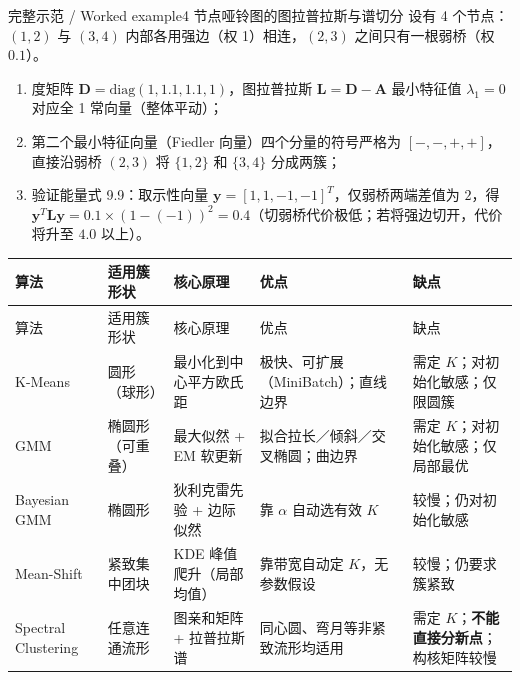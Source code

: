 \begin{StudyBlock}{完整示范 / Worked example}{4 节点哑铃图的图拉普拉斯与谱切分}
设有 4 个节点：$(1,2)$ 与 $(3,4)$ 内部各用强边（权 1）相连，$(2,3)$ 之间只有一根弱桥（权 $0.1$）。
\begin{enumerate}
\item 度矩阵 $\mathbf{D}=\mathrm{diag}(1, 1.1, 1.1, 1)$，图拉普拉斯 $\mathbf{L}=\mathbf{D}-\mathbf{A}$ 最小特征值 $\lambda_1=0$ 对应全 1 常向量（整体平动）；
\item 第二个最小特征向量（Fiedler 向量）四个分量的符号严格为 $[-, -, +, +]$，直接沿弱桥 $(2,3)$ 将 $\{1,2\}$ 和 $\{3,4\}$ 分成两簇；
\item 验证能量式 9.9：取示性向量 $\mathbf{y}=[1,1,-1,-1]^T$，仅弱桥两端差值为 $2$，得 $\mathbf{y}^T\mathbf{L}\mathbf{y} = 0.1\times (1-(-1))^2 = 0.4$（切弱桥代价极低；若将强边切开，代价将升至 $4.0$ 以上）。
\end{enumerate}
\end{StudyBlock}


\begingroup\small\setlength{\tabcolsep}{3pt}\renewcommand{\arraystretch}{1.22}
\begin{longtable}{@{}>{\raggedright\arraybackslash}p{}>{\raggedright\arraybackslash}p{}>{\raggedright\arraybackslash}p{}>{\raggedright\arraybackslash}p{}>{\raggedright\arraybackslash}p{}@{}}
\toprule
算法 & 适用簇形状 & 核心原理 & 优点 & 缺点 \\
\midrule\endfirsthead
算法 & 适用簇形状 & 核心原理 & 优点 & 缺点 \\
\midrule\endhead
\bottomrule\endfoot
K-Means & 圆形（球形） & 最小化到中心平方欧氏距 & 极快、可扩展（MiniBatch）；直线边界 & 需定 $K$；对初始化敏感；仅限圆簇 \\
GMM & 椭圆形（可重叠） & 最大似然 + EM 软更新 & 拟合拉长／倾斜／交叉椭圆；曲边界 & 需定 $K$；对初始化敏感；仅局部最优 \\
Bayesian GMM & 椭圆形 & 狄利克雷先验 + 边际似然 & 靠 $\alpha$ 自动选有效 $K$ & 较慢；仍对初始化敏感 \\
Mean-Shift & 紧致集中团块 & KDE 峰值爬升（局部均值） & 靠带宽自动定 $K$，无参数假设 & 较慢；仍要求簇紧致 \\
Spectral Clustering & 任意连通流形 & 图亲和矩阵 + 拉普拉斯谱 & 同心圆、弯月等非紧致流形均适用 & 需定 $K$；\textbf{不能直接分新点}；构核矩阵较慢 \\
\end{longtable}\endgroup

